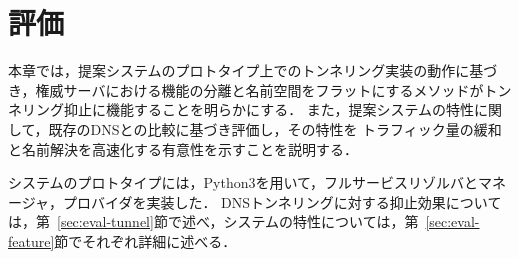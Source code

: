 \section{評価}
\label{sec:evaluation}
%
%
本章では，提案システムのプロトタイプ上でのトンネリング実装の動作に基づき，権威サーバにおける機能の分離と名前空間をフラットにするメソッドがトンネリング抑止に機能することを明らかにする．
また，提案システムの特性に関して，既存のDNSとの比較に基づき評価し，その特性を
トラフィック量の緩和と名前解決を高速化する有意性を示すことを説明する．

システムのプロトタイプには，Python3を用いて，フルサービスリゾルバとマネージャ，プロバイダを実装した．
DNSトンネリングに対する抑止効果については，第~\ref{sec:eval-tunnel}節で述べ，システムの特性については，第~\ref{sec:eval-feature}節でそれぞれ詳細に述べる．


%
%
%
%
%
%
%

